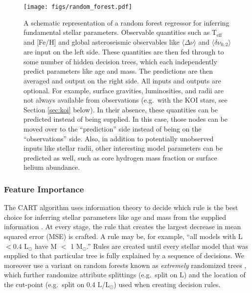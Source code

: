 \documentclass[twocolumn,twocolappendix]{aastex6}
\newif\ifref
\newcommand{\mb}[1]{\ifref\boldmath\textbf{#1}\unboldmath\else #1\fi}
\begin{document}
\begin{figure*}[ht]
    \centering
    \texttt{[image: figs/random\_forest.pdf]}
    \caption{A schematic representation of a random forest regressor for inferring fundamental stellar parameters. \mb{Observable quantities} such as \mb{T$_{\text{eff}}$ and [Fe/H]} and global asteroseismic observables like \mb{$\langle\Delta\nu\rangle$ and} $\langle\delta\nu_{0,2}\rangle$ are input on the left side. These quantities are then fed through to some number of hidden decision trees, which each independently predict \mb{parameters} like age and mass. The predictions are then averaged and output on the right side. All inputs and outputs are optional. For example, surface gravities, luminosities, and radii are not always available \mb{from observations} (e.g.\ with the KOI stars\mb{, see Section \ref{sec:koi} below}). In their absence, these quantities can be predicted instead of being supplied. In this case, those nodes can be moved over to the ``prediction'' side instead of being on the ``observations'' side. Also, in addition to potentially unobserved inputs like stellar radii, other interesting model parameters can be predicted as well, such as core hydrogen mass fraction or surface helium abundance. \label{fig:rf} }
\end{figure*}


\subsubsection{Feature Importance} \label{sec:importances}

\mb{The CART algorithm uses} information theory to decide which rule is the best choice for inferring \mb{stellar parameters} like age and mass from the supplied information \citep[][Chapter 9]{hastie2005elements}. At every stage, the rule that creates the largest decrease in mean squared error (MSE) is crafted. A rule may be, for example, ``all models with L $<0.4$ L$_\odot$ have M $<$ 1 M$_\odot$.'' Rules are created until every \mb{stellar model} that was supplied to that particular tree is fully explained by a sequence of decisions. We moreover use a variant on random forests known as \emph{extremely} randomized trees \citep{geurts2006extremely}, which further randomize attribute splittings (e.g.\ split on L) and the location of the cut-point (e.g.\ split on 0.4 L/L$_\odot$) used when creating decision rules. 
\end{document}
